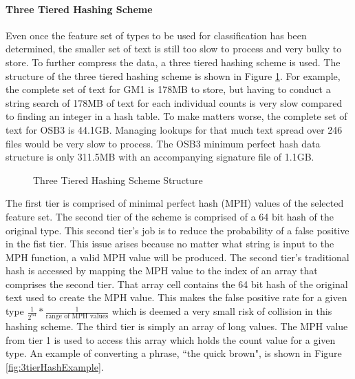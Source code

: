 		\paragraph{Three Tiered Hashing Scheme} Even once the feature set of types to be used for classification has been determined, the smaller set of text is still too slow to process and very bulky to store.  To further compress the data, a three tiered hashing scheme is used.  The structure of the three tiered hashing scheme is shown in Figure \ref{fig:3tierHashStructure}. For example, the complete set of text for GM1 is 178MB to store, but having to conduct a string search of 178MB of text for each individual counts is very slow compared to finding an integer in a hash table. To make matters worse, the complete set of text for OSB3 is 44.1GB. Managing lookups for that much text spread over 246 files would be very slow to process. The OSB3 minimum perfect hash data structure is only 311.5MB with an accompanying signature file of 1.1GB.   
		
		\begin{figure}[ht!]
			\begin{center}
				\caption{Three Tiered Hashing Scheme Structure}
				\label{fig:3tierHashStructure}
			\end{center}
		\end{figure}
		
		The first tier is comprised of minimal perfect hash (MPH) values of the selected feature set.  The second tier of the scheme is comprised of a 64 bit hash of the original type.  This second tier's job is to reduce the probability of a false positive in the fist tier.  This issue arises because no matter what string is input to the MPH function, a valid MPH value will be produced.  The second tier's traditional hash is accessed by mapping the MPH value to the index of an array that comprises the second tier.  That array cell contains the 64 bit hash of the original text used to create the MPH value.  This makes the false positive rate for a given type $\frac{1}{2^{64}} * \frac{1}{\text{range of MPH values}}$ which is deemed a very small risk of collision in this hashing scheme.  The third tier is simply an array of long values.  The MPH value from tier 1 is used to access this array which holds the count value for a given type.  An example of converting a phrase, ``the quick brown", is shown in Figure \ref{fig:3tierHashExample}. 
		
